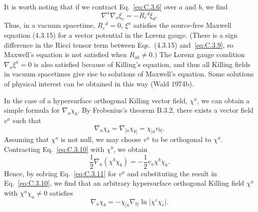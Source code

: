 It is worth noting that if we contract Eq.~\eqref{eq:C.3.6} over \(a\) and \(b\), we
find
\begin{equation}
  \nabla^a\nabla_a\xi_c=-R_c{}^d\xi_d.
  \tag{C.3.9}\label{eq:C.3.9}
\end{equation}
Thus, in a vacuum spacetime, \(R_c{}^d=0\), \(\xi^a\) satisfies the source-free
Maxwell equation (4.3.15) for a vector potential in the Lorenz gauge. (There is a
sign difference in the Ricci tensor term between Eqs.~(4.3.15) and~\eqref{eq:C.3.9},
so Maxwell's equation is not satisfied when \(R_{ab}\ne0\).) The Lorenz gauge
condition \(\nabla_a\xi^a=0\) is also satisfied because of Killing's equation, and
thus all Killing fields in vacuum spacetimes give rise to solutions of Maxwell's
equation. Some solutions of physical interest can be obtained in this way
(Wald 1974b).

In the case of a hypersurface orthogonal Killing vector field, \(\chi^a\), we can
obtain a simple formula for \(\nabla_a\chi_b\). By Frobenius's theorem B.3.2, there
exists a vector field \(v^a\) such that
\begin{equation}
  \nabla_a\chi_b=\nabla_{[a}\chi_{b]}=\chi_{[a}v_{b]}.
  \tag{C.3.10}\label{eq:C.3.10}
\end{equation}
Assuming that \(\chi^a\) is not null, we may choose \(v^a\) to be orthogonal to
\(\chi^a\). Contracting Eq.~\eqref{eq:C.3.10} with \(\chi^b\), we obtain
\begin{equation}
  \frac{1}{2}\nabla_a(\chi^b\chi_b)
  =-\frac{1}{2}v_a\chi^b\chi_b.
  \tag{C.3.11}\label{eq:C.3.11}
\end{equation}
Hence, by solving Eq.~\eqref{eq:C.3.11} for \(v^a\) and substituting the result in
Eq.~\eqref{eq:C.3.10}, we find that an arbitrary hypersurface orthogonal Killing
field \(\chi^a\) with \(\chi^a\chi_a\ne0\) satisfies
\begin{equation}
  \nabla_a\chi_b=-\chi_{[a}\nabla_{b]}\ln\lvert\chi^c\chi_c\rvert.
  \tag{C.3.12}\label{eq:C.3.12}
\end{equation}


